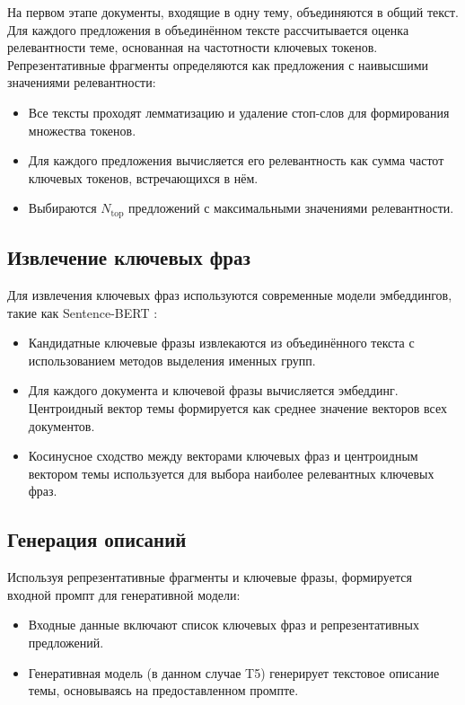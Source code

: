 \documentclass{article}
\begin{document}
На первом этапе документы, входящие в одну тему, объединяются в общий текст. Для каждого предложения в объединённом тексте рассчитывается оценка релевантности теме, основанная на частотности ключевых токенов. Репрезентативные фрагменты определяются как предложения с наивысшими значениями релевантности:
\begin{itemize}
    \item Все тексты проходят лемматизацию и удаление стоп-слов для формирования множества токенов.
    \item Для каждого предложения вычисляется его релевантность как сумма частот ключевых токенов, встречающихся в нём.
    \item Выбираются $ N_{\text{top}} $ предложений с максимальными значениями релевантности.
\end{itemize}

\subsection{Извлечение ключевых фраз}

Для извлечения ключевых фраз используются современные модели эмбеддингов, такие как Sentence-BERT \cite{7kiselev2005clustering}:
\begin{itemize}
    \item Кандидатные ключевые фразы извлекаются из объединённого текста с использованием методов выделения именных групп.
    \item Для каждого документа и ключевой фразы вычисляется эмбеддинг. Центроидный вектор темы формируется как среднее значение векторов всех документов.
    \item Косинусное сходство между векторами ключевых фраз и центроидным вектором темы используется для выбора наиболее релевантных ключевых фраз.
\end{itemize}

\subsection{Генерация описаний}

Используя репрезентативные фрагменты и ключевые фразы, формируется входной промпт для генеративной модели:
\begin{itemize}
    \item Входные данные включают список ключевых фраз и репрезентативных предложений.
    \item Генеративная модель (в данном случае T5) генерирует текстовое описание темы, основываясь на предоставленном промпте.\cite{8daume2009alignment}
\end{itemize}
\end{document}
